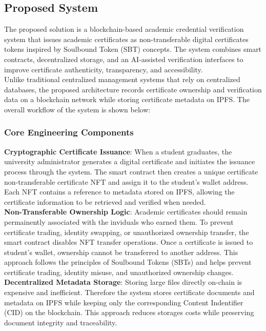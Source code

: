 \subsection{Proposed System}



The proposed solution is a blockchain-based academic credential verification system that issues academic certificates as non-transferable digital certificates tokens inspired by Soulbound Token (SBT) concepts. The system combines smart contracts, decentralized storage, and an AI-assisted verification interfaces to improve certificate authenticity, transparency, and accessibility.\\

Unlike traditional centralized management systems that rely on centralized databases, the proposed architecture records certificate ownership and verification data on a blockchain network while storing certificate metadata on IPFS. The overall workflow of the system is shown below:



\subsubsection{Core Engineering Components}

\textbf{Cryptographic Certificate Issuance}: When a student graduates, the university administrator generates a digital certificate and initiates the issuance process through the system. The smart contract then creates a unique certificate non-transferable certificate NFT and assign it to the student's wallet address. Each NFT contains a reference to metadata stored on IPFS, allowing the certificate information to be retrieved and verified when needed.\\

\textbf{Non-Transferable Ownership Logic}: Academic certificates should remain permainently associated with the inviduals who earned them. To prevent certificate trading, identity swapping, or unauthorized ownership transfer, the smart contract disables NFT transfer operations. Once a certificate is issued to student's wallet, ownership cannot be transferred to another address. This approach follows the principles of Soulbound Tokens (SBTs) and helps prevent certificate trading, identity misuse, and unauthorized ownership changes.\\

\textbf{Decentralized Metadata Storage}: Storing large files directly on-chain is expensive and inefficient. Therefore the system stores certificate documents and metadata on IPFS while keeping only the corresponding Content Indentifier (CID) on the blockchain. This approach reduces storages costs while preserving document integrity and traceability.

